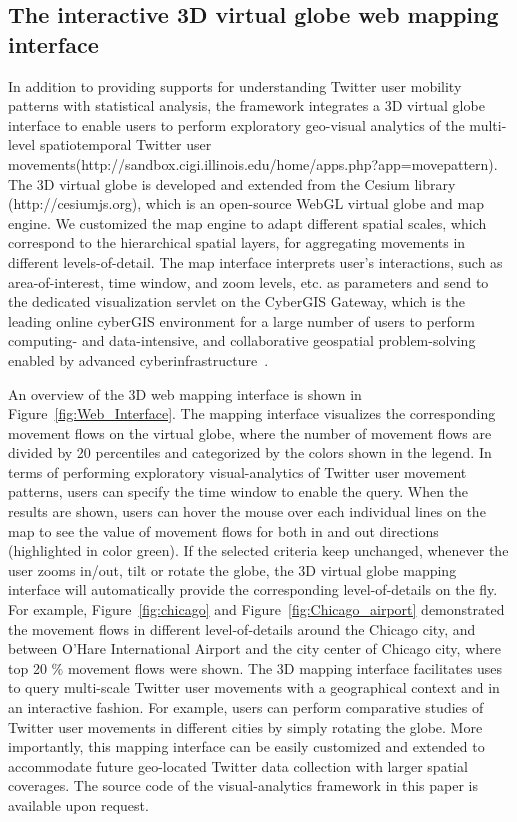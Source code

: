 \documentclass[ijgi,article,accept,moreauthors,pdftex,10pt,a4paper]{mdpi}
\theoremstyle{mdpi}
\newcounter{ex}
\newcounter{re}
\theoremstyle{mdpidefinition}
\begin{document}
\subsection{The interactive 3D virtual globe web mapping interface}
In addition to providing supports for understanding Twitter user mobility patterns with statistical analysis, the framework integrates a 3D virtual globe interface to enable users to perform exploratory geo-visual analytics of the multi-level spatiotemporal Twitter user movements(http://sandbox.cigi.illinois.edu/home/apps.php?app=movepattern). 
The 3D virtual globe is developed and extended from the Cesium library (http://cesiumjs.org), which is an open-source WebGL virtual globe and map engine.
We customized the map engine to adapt different spatial scales, which correspond to the hierarchical spatial layers, for aggregating movements in different levels-of-detail.
The map interface interprets user's interactions, such as area-of-interest, time window, and zoom levels, etc. as parameters and send to the dedicated visualization servlet on the CyberGIS Gateway, which is the leading online cyberGIS environment for a large number of users to perform computing- and data-intensive, and collaborative geospatial problem-solving enabled by advanced cyberinfrastructure~\cite{liu2014cybergis}.

An overview of the 3D web mapping interface is shown in Figure~\ref{fig:Web_Interface}.
The mapping interface visualizes the corresponding movement flows on the virtual globe, where the number of movement flows are divided by 20 percentiles and categorized by the colors shown in the legend.
In terms of performing exploratory visual-analytics of Twitter user movement patterns, users can specify the time window to enable the query. 
When the results are shown, users can hover the mouse over each individual lines on the map to see the value of movement flows for both in and out directions (highlighted in color green).
If the selected criteria keep unchanged, whenever the user zooms in/out, tilt or rotate the globe, the 3D virtual globe mapping interface will automatically provide the corresponding level-of-details on the fly.
For example, Figure~\ref{fig:chicago} and Figure~\ref{fig:Chicago_airport} demonstrated the movement flows in different level-of-details around the Chicago city, and between O'Hare International Airport and the city center of Chicago city, where top 20 $\%$ movement flows were shown.
The 3D mapping interface facilitates uses to query multi-scale Twitter user movements with a geographical context and in an interactive fashion.
For example, users can perform comparative studies of Twitter user movements in different cities by simply rotating the globe. 
More importantly, this mapping interface can be easily customized and extended to accommodate future geo-located Twitter data collection with larger spatial coverages.
The source code of the visual-analytics framework in this paper is available upon request.
\end{document}
